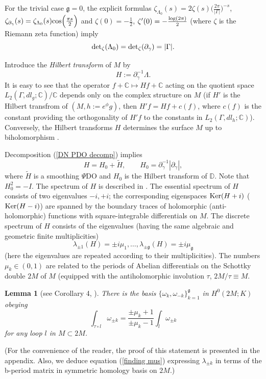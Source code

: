\documentclass{amsart}
\newtheorem{lemma}[theorem]{Lemma}
\begin{document}
For the trivial case $\mathfrak{g}=0$, the explicit formulas $\zeta_{\Lambda_0}(s)=2\zeta(s)\Big(\frac{2\pi}{|\Gamma|}\Big)^{-s}$, $\zeta_{\partial_\gamma}(s)=\zeta_{\Lambda_0}(s){\rm cos}\Big(\frac{\pi s}{2}\Big)$ and $\zeta(0)=-\frac{1}{2}$, $\zeta'(0)=-\frac{{\rm log}(2\pi)}{2}$ (where $\zeta$ is the Riemann zeta function) imply
\begin{equation}
\label{GG formula disk}
{\rm det}_\zeta(\Lambda_0)={\rm det}_\zeta(\partial_\gamma)=|\Gamma|.
\end{equation}

Introduce the {\it Hilbert transform} of $M$ by
\begin{equation*}
H:=\partial_\gamma^{-1}\Lambda.
\end{equation*}
It is easy to see that the operator $f+\mathbb{C}\mapsto Hf+\mathbb{C}$ acting on the quotient space $L_2(\Gamma,dl_g;\mathbb{C})/\mathbb{C}$ depends only on the complex structure on $M$ (if $H'$ is the Hilbert transfrom of $(M,h:=e^\phi g)$, then $H'f=Hf+c(f)$, where $c(f)$ is the constant providing the orthogonality of $H'f$ to the constants in $L_2(\Gamma,dl_h;\mathbb{C})$). Conversely, the Hilbert transforms $H$ determines the surface $M$ up to biholomorphism \cite{B}. 

Decomposition (\ref{DN PDO decomp}) implies
\begin{equation}
\label{Hilbert PDO decomp}
H=H_0+\tilde{H}, \qquad H_0=\partial_\gamma^{-1}|\partial_\gamma|,
\end{equation}
where $\tilde{H}$ is a smoothing $\Psi$DO and $H_0$ is the Hilbert transform of $\mathbb{D}$. Note that $H_0^2=-I$. The spectrum of $H$ is described in \cite{HilbKor}. The essential spectrum of $H$ consists of two eigenvalues $-i,+i$; the corresponding eigenspaces ${\rm Ker}(H+i)$ (${\rm Ker}(H-i)$) are spanned by the boundary traces of holomorphic (anti-holomorphic) functions with square-integrable differentials on $M$. The discrete spectrum of $H$ consists of the eigenvalues (having the same algebraic and geometric finite multiplicities)
$$\lambda_{\pm 1}(H)=\pm i\mu_1,\dots,\lambda_{\pm\mathfrak{g}}(H)=\pm i\mu_{\mathfrak{g}}$$ 
(here the eigenvalues are repeated according to their multiplicities). The numbers $\mu_k\in (0,1)$ are related to the periods of Abelian differentials on the Schottky double $2M$ of $M$ (equipped with the antiholomorphic involution $\tau$, $2M/\tau\equiv M$. 
\begin{lemma}[see Corollary 4, \cite{znsbKor}] \label{Kolemma} There is the basis $\{\omega_{k},\omega_{-k}\}_{k=1}^{\mathfrak{g}}$ in $H^0(2M;K)$ obeying
$$\int_{\tau\circ l}\omega_{\pm k}=\frac{\pm \mu_k+1}{\pm\mu_k-1}\int_{l}\omega_{\pm k}$$
for any loop $l$ in $M\subset 2M$.
\end{lemma}
(For the convenience of the reader, the proof of this statement is presented in the appendix. Also, we deduce equation (\ref{finding mus}) expressing $\lambda_{\pm k}$ in terms of the b-period matrix in symmetric homology basis on $2M$.)
\end{document}
